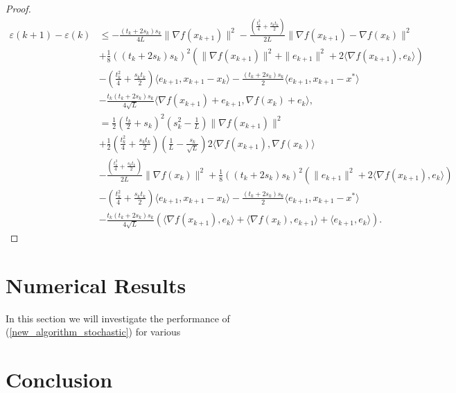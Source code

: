\documentclass{article}
\theoremstyle{plain}
\theoremstyle{definition}
\theoremstyle{remark}
\begin{document}
\begin{proof}
\begin{align}
            \varepsilon(k+1)-\varepsilon(k)&\leq -\frac{(t_k+2s_k)s_k}{4L} \|\nabla f(x_{k+1})\|^2-\frac{(\frac{t_{k}^2}{4}+\frac{s_{k}t_{k}}{2})}{2L}\|\nabla f(x_{k+1})-\nabla f(x_k)\|^2\nonumber\\
            &+\frac{1}{8}((t_k+2s_k)s_k)^2(\|\nabla f(x_{k+1})\|^2+\|e_{k+1}\|^2+2\langle \nabla f(x_{k+1}) ,e_k \rangle) \nonumber\\
            & -(\frac{t_k^2}{4}+\frac{s_kt_k}{2})\langle e_{k+1},x_{k+1}-x_k\rangle-\frac{(t_k+2s_k)s_k}{2}\langle e_{k+1},x_{k+1}-x^*\rangle\nonumber\\
         & -\frac{t_k(t_k+2s_k)s_k}{4\sqrt{L}}\langle \nabla f(x_{k+1})+e_{k+1}, \nabla f(x_k)+e_k \rangle,\nonumber\\
         &=\frac{1}{2}\left(\frac{t_k}{2}+s_k\right)^2(s_k^2-\frac{1}{L})\|\nabla f(x_{k+1})\|^2\nonumber\\
         &+\frac{1}{2}\left(\frac{t_k^2}{4}+\frac{s_kt_k}{2} \right)(\frac{1}{L}-\frac{s_k}{\sqrt{L}}) 2\langle \nabla f(x_{k+1}),\nabla f(x_k) \rangle\nonumber\\
         &-\frac{(\frac{t_{k}^2}{4}+\frac{s_{k}t_{k}}{2})}{2L}\|\nabla f(x_k)\|^2+\frac{1}{8}((t_k+2s_k)s_k)^2(\|e_{k+1}\|^2+2\langle \nabla f(x_{k+1}) ,e_k \rangle)\nonumber\\
         & -(\frac{t_k^2}{4}+\frac{s_kt_k}{2})\langle e_{k+1},x_{k+1}-x_k\rangle-\frac{(t_k+2s_k)s_k}{2}\langle e_{k+1},x_{k+1}-x^*\rangle\nonumber\\
         &-\frac{t_k(t_k+2s_k)s_k}{4\sqrt{L}}\left(\langle \nabla f(x_{k+1}),e_k \rangle+\langle \nabla f(x_{k}) , e_{k+1}\rangle+\langle e_{k+1},e_k\rangle\right).
        \end{align}

    
\end{proof}






\section{Numerical Results}\label{sec_numerical}
In this section we will investigate the performance of (\ref{new_algorithm_stochastic}) for various 
\section{Conclusion}\label{sec_conclusion}


\end{document}
